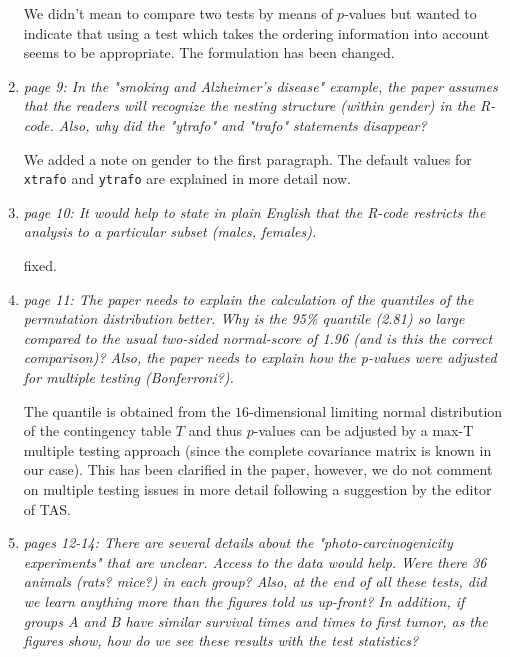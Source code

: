 \documentclass[11pt]{article}
\begin{document}
\begin{enumerate}
We didn't mean to compare two tests by means of $p$-values but wanted to
indicate that using a test which takes the ordering information into account
seems to be appropriate. The formulation has been changed.

\item \textsl{page 9:  In the "smoking and Alzheimer's disease" example, the paper assumes that the 
              readers will recognize the nesting structure (within gender) in the R-code. Also, 
              why did the "ytrafo" and "trafo" statements disappear? }
 
We added a note on gender to the first paragraph. The default values for
\texttt{xtrafo} and \texttt{ytrafo} are explained in more detail now.

\item \textsl{page 10:  It would help to state in plain English that the R-code restricts the 
              analysis to a particular subset (males, females).}
 
fixed.

\item \textsl{page 11:  The paper needs to explain the calculation of the quantiles of the 
              permutation distribution better. Why is the 95\% quantile (2.81) so large compared to the 
              usual two-sided normal-score of 1.96 (and is this the correct comparison)? Also, 
              the paper needs to explain how the p-values were adjusted for multiple testing 
              (Bonferroni?).}

The quantile is obtained from the $16$-dimensional limiting normal distribution
of the contingency table $T$ and thus $p$-values can be adjusted by a
max-T multiple testing approach (since the complete covariance matrix is
known in our case). This has been clarified in the paper, however, we do not
comment on multiple testing issues in more detail following a suggestion by
the editor of TAS.
 
\item \textsl{pages 12-14:  There are several details about the "photo-carcinogenicity experiments" 
              that are unclear. Access to the data would help. Were there 36 animals (rats? mice?) 
              in each group? Also, at the end of all these tests, did we learn anything more than the 
              figures told us up-front? 
              In addition, if groups A and B have similar survival times and times to first tumor, 
              as the figures show, how do we see these results with the test statistics? }


\end{enumerate}
\end{document}
